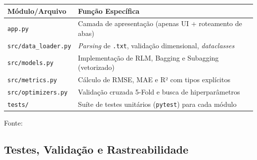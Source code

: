 \begin{quadro}[ht]
\begin{center}
\small
\captionsetup{justification=centering, labelsep=endash, width=0.75\linewidth}
\caption{Estrutura modular e responsabilidades}
\label{quadro:estrutura}
\begin{threeparttable}
\begin{tabularx}{\textwidth}{|l|X|} \hline
\textbf{Módulo/Arquivo} & \textbf{Função Específica} \\ \hline
\texttt{app.py} & Camada de apresentação (apenas UI + roteamento de abas) \\ \hline
\texttt{src/data\_loader.py} & \textit{Parsing} de \texttt{.txt}, validação dimensional, \textit{dataclasses} \\ \hline
\texttt{src/models.py} & Implementação de RLM, Bagging e Subagging (vetorizado) \\ \hline
\texttt{src/metrics.py} & Cálculo de RMSE, MAE e R² com tipos explícitos \\ \hline
\texttt{src/optimizers.py} & Validação cruzada 5-Fold e busca de hiperparâmetros \\ \hline
\texttt{tests/} & Suíte de testes unitários (\texttt{pytest}) para cada módulo \\ \hline
\end{tabularx}
\begin{tablenotes}[flushleft]
\footnotesize
\item Fonte:~\oautor
\end{tablenotes}
\end{threeparttable}
\end{center}
\end{quadro}

\newpage
\subsection{Testes, Validação e Rastreabilidade}
\label{subsec:testes-rtm}

